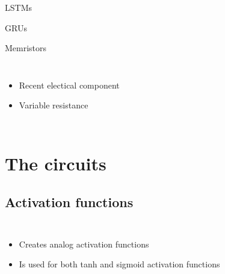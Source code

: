 \documentclass[14pt]{beamer}
\begin{document}
\begin{frame}{\insertsection}{LSTMs}
  
\end{frame}

\begin{frame}{\insertsection}{GRUs}
  
\end{frame}

\begin{frame}{\insertsection}{Memristors}
  \begin{columns}
    
    \begin{itemize}
      \item Recent electical component
      \item Variable resistance
    \end{itemize}
  \end{columns}
\end{frame}


\section{The circuits}
\subsection{Activation functions}
\begin{frame}{\insertsection}{\insertsubsection}
  \begin{columns}
    
    \begin{itemize}
      \item Creates analog activation functions
      \item Is used for both tanh and sigmoid activation functions
    \end{itemize}
  \end{columns}
\end{frame}

\begin{frame}{\insertsection}{\insertsubsection}
  \begin{center}
    
  \end{center}
\end{frame}
\end{document}
